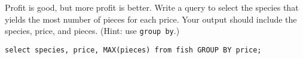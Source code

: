 \begin{blocksection}
\question Profit is good, but more profit is better. Write a query to select the species that yields the most number of pieces for each price. Your output should include the species, price, and pieces. (Hint: use \texttt{group by}.)

\begin{solution}[.75in]
\begin{lstlisting}
select species, price, MAX(pieces) from fish GROUP BY price;
\end{lstlisting}
\end{solution}
\end{blocksection}
